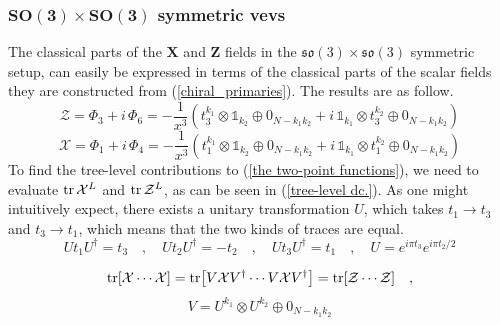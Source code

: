 \subsubsection[$SO(3) \times SO(3)$ symmetric vevs]{$\mathbf{SO(3) \times SO(3)}$ symmetric vevs}
The classical parts of the ${\boldsymbol{X}}$ and ${\boldsymbol{Z}}$ fields in the $\mathfrak{so}(3) \times \mathfrak{so}(3)$ symmetric setup, can easily be expressed in terms of the classical parts of the scalar fields they are constructed from (\ref{chiral_primaries}). The results are as follow.
%
%
\begin{equation}
\mathcal{Z} = \Phi_3 + i \, \Phi_6
= -\frac{1}{x^3}
\left(
t_3^{k_1} \otimes \mathbb{1}_{k_2} \oplus 0_{N-k_1 k_2}
+ i \, \mathbb{1}_{k_1} \otimes t_3^{k_2} \oplus 0_{N-k_1 k_2}
\right)
\end{equation}
%
%
\begin{equation}
\mathcal{X} = \Phi_1 + i \, \Phi_4
= -\frac{1}{x^3}
\left(
t_1^{k_1} \otimes \mathbb{1}_{k_2} \oplus 0_{N-k_1 k_2}
+ i \, \mathbb{1}_{k_1} \otimes t_1^{k_2} \oplus 0_{N-k_1 k_2}
\right)
\end{equation}
%
%
To find the tree-level contributions to (\ref{the two-point functions}), we need to evaluate $\tr \mathcal{X}^L$ and $\tr \mathcal{Z}^L$, as can be seen in (\ref{tree-level dc.}). As one might intuitively expect, there exists a unitary transformation $U$, which takes $t_1 \to t_3$ and $t_3 \to t_1$, which means that the two kinds of traces are equal.
%
%
\begin{equation}
U t_1 U^\dagger = t_3
%
\quad , \quad
%
U t_2 U^\dagger = -t_2
%
\quad , \quad
%
U t_3 U^\dagger = t_1
%
\quad , \quad
%
U = e^{i \pi t_3} e^{i \pi t_2 / 2}
\end{equation}
%
%

%
%
\begin{equation*}
\tr[ \mathcal{X} \cdots \mathcal{X} ]
=
\tr[ V \mathcal{X} V^\dagger \cdots V \mathcal{X} V^\dagger ]
=
\tr[ \mathcal{Z} \cdots \mathcal{Z} ]
%
\quad ,
\end{equation*}
%
%
\begin{equation}
V = U^{k_1} \otimes U^{k_2} \oplus 0_{N - k_1 k_2}
\end{equation}
%
%

